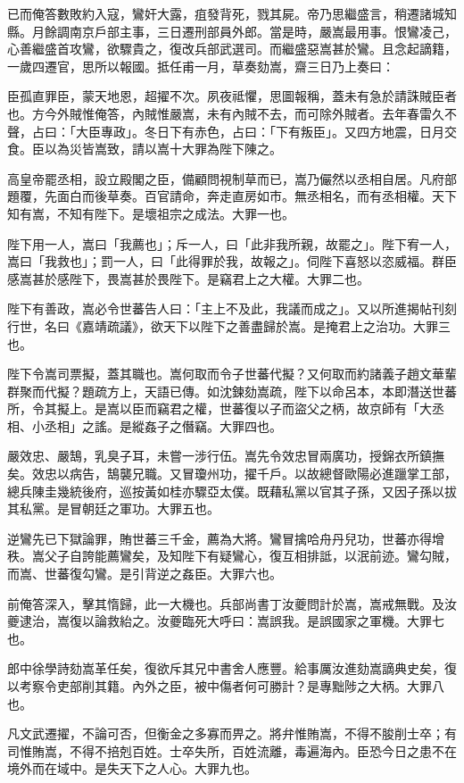 \begin{pinyinscope}
{{已而俺答數敗約入寇，鸞奸大露，疽發背死，戮其屍。帝乃思繼盛言，稍遷諸城知縣。月餘調南京戶部主事，三日遷刑部員外郎。當是時，嚴嵩最用事。恨鸞凌己，心善繼盛首攻鸞，欲驟貴之，復改兵部武選司。而繼盛惡嵩甚於鸞。且念起謫籍，一歲四遷官，思所以報國。抵任甫一月，草奏劾嵩，齋三日乃上奏曰：

臣孤直罪臣，蒙天地恩，超擢不次。夙夜祗懼，思圖報稱，蓋未有急於請誅賊臣者也。方今外賊惟俺答，內賊惟嚴嵩，未有內賊不去，而可除外賊者。去年春雷久不聲，占曰：「大臣專政」。冬日下有赤色，占曰：「下有叛臣」。又四方地震，日月交食。臣以為災皆嵩致，請以嵩十大罪為陛下陳之。

高皇帝罷丞相，設立殿閣之臣，備顧問視制草而已，嵩乃儼然以丞相自居。凡府部題覆，先面白而後草奏。百官請命，奔走直房如市。無丞相名，而有丞相權。天下知有嵩，不知有陛下。是壞祖宗之成法。大罪一也。

陛下用一人，嵩曰「我薦也」；斥一人，曰「此非我所親，故罷之」。陛下宥一人，嵩曰「我救也」；罰一人，曰「此得罪於我，故報之」。伺陛下喜怒以恣威福。群臣感嵩甚於感陛下，畏嵩甚於畏陛下。是竊君上之大權。大罪二也。

陛下有善政，嵩必令世蕃告人曰：「主上不及此，我議而成之」。又以所進揭帖刊刻行世，名曰《嘉靖疏議》，欲天下以陛下之善盡歸於嵩。是掩君上之治功。大罪三也。

陛下令嵩司票擬，蓋其職也。嵩何取而令子世蕃代擬？又何取而約諸義子趙文華輩群聚而代擬？題疏方上，天語已傳。如沈鍊劾嵩疏，陛下以命呂本，本即潛送世蕃所，令其擬上。是嵩以臣而竊君之權，世蕃復以子而盜父之柄，故京師有「大丞相、小丞相」之謠。是縱姦子之僭竊。大罪四也。

嚴效忠、嚴鵠，乳臭子耳，未嘗一涉行伍。嵩先令效忠冒兩廣功，授錦衣所鎮撫矣。效忠以病告，鵠襲兄職。又冒瓊州功，擢千戶。以故總督歐陽必進躐掌工部，總兵陳圭幾統後府，巡按黃如桂亦驟亞太僕。既藉私黨以官其子孫，又因子孫以拔其私黨。是冒朝廷之軍功。大罪五也。

逆鸞先已下獄論罪，賄世蕃三千金，薦為大將。鸞冒擒哈舟丹兒功，世蕃亦得增秩。嵩父子自誇能薦鸞矣，及知陛下有疑鸞心，復互相排詆，以泯前迹。鸞勾賊，而嵩、世蕃復勾鸞。是引背逆之姦臣。大罪六也。

前俺答深入，擊其惰歸，此一大機也。兵部尚書丁汝夔問計於嵩，嵩戒無戰。及汝夔逮治，嵩復以論救紿之。汝夔臨死大呼曰：嵩誤我。是誤國家之軍機。大罪七也。

郎中徐學詩劾嵩革任矣，復欲斥其兄中書舍人應豐。給事厲汝進劾嵩謫典史矣，復以考察令吏部削其籍。內外之臣，被中傷者何可勝計？是專黜陟之大柄。大罪八也。

凡文武遷擢，不論可否，但衡金之多寡而畀之。將弁惟賄嵩，不得不朘削士卒；有司惟賄嵩，不得不掊剋百姓。士卒失所，百姓流離，毒遍海內。臣恐今日之患不在境外而在域中。是失天下之人心。大罪九也。

}}
\end{pinyinscope}
